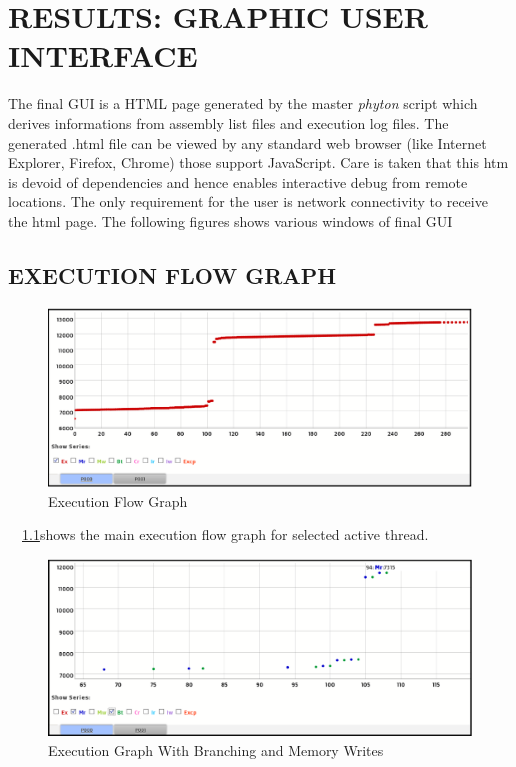 \chapter{RESULTS: GRAPHIC USER INTERFACE}
\label{chap:GUI_results.tex}
The final GUI is a HTML page generated by the master {\it phyton} script which derives informations from assembly list files and execution log files. The generated .html file can be viewed by any standard web browser (like Internet Explorer, Firefox, Chrome) those support JavaScript. Care is taken that this htm is devoid of dependencies and hence enables interactive debug from remote locations. The only requirement for the user is network connectivity to receive the html page. The following figures shows various windows of final GUI
\section {EXECUTION FLOW GRAPH}
\begin{figure}[h]
\centering
\includegraphics[width=6in]{./figures/gui_graph1.eps}
\caption{Execution Flow Graph}
\label{fig:gui_graph1.eps}
\end{figure}

~\figurename{~\ref{fig:gui_graph1.eps}}shows the main execution flow graph for selected active thread.  
\begin{figure}[h]
\centering
\includegraphics[width=6in]{./figures/gui_graph2.eps}
\caption{Execution Graph With Branching and Memory Writes}
\label{fig:gui_graph2.eps}
\end{figure}

